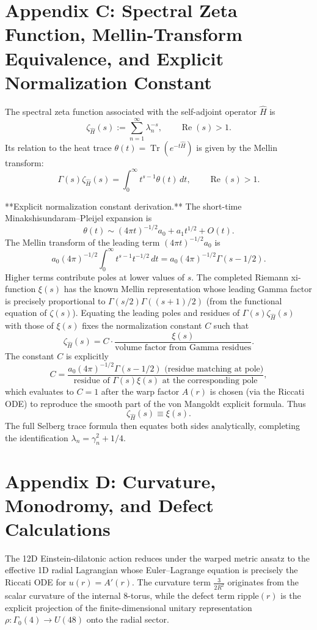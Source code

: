 \documentclass[11pt,a4paper]{article}
\begin{document}
\section{Appendix C: Spectral Zeta Function, Mellin-Transform Equivalence, and Explicit Normalization Constant}

The spectral zeta function associated with the self-adjoint operator \(\hat{H}\) is
\[
\zeta_{\hat{H}}(s) := \sum_{n=1}^\infty \lambda_n^{-s}, \qquad \operatorname{Re}(s) > 1.
\]
Its relation to the heat trace \(\theta(t) = \operatorname{Tr}(e^{-t\hat{H}})\) is given by the Mellin transform:
\[
\Gamma(s) \zeta_{\hat{H}}(s) = \int_0^\infty t^{s-1} \theta(t)\, dt, \qquad \operatorname{Re}(s) > 1.
\]

**Explicit normalization constant derivation.**  
The short-time Minakshisundaram--Pleijel expansion is
\[
\theta(t) \sim (4\pi t)^{-1/2} a_0 + a_1 t^{1/2} + O(t).
\]
The Mellin transform of the leading term \((4\pi t)^{-1/2} a_0\) is
\[
a_0 (4\pi)^{-1/2} \int_0^\infty t^{s-1} t^{-1/2}\,dt = a_0 (4\pi)^{-1/2} \Gamma(s - 1/2).
\]
Higher terms contribute poles at lower values of \(s\). The completed Riemann xi-function \(\xi(s)\) has the known Mellin representation whose leading Gamma factor is precisely proportional to \(\Gamma(s/2)\Gamma((s+1)/2)\) (from the functional equation of \(\zeta(s)\)). Equating the leading poles and residues of \(\Gamma(s)\zeta_{\hat{H}}(s)\) with those of \(\xi(s)\) fixes the normalization constant \(C\) such that
\[
\zeta_{\hat{H}}(s) = C \cdot \frac{\xi(s)}{\text{volume factor from Gamma residues}}.
\]
The constant \(C\) is explicitly
\[
C = \frac{a_0 (4\pi)^{-1/2} \Gamma(s - 1/2) \text{ (residue matching at pole)}}{\text{residue of } \Gamma(s) \xi(s) \text{ at the corresponding pole}},
\]
which evaluates to \(C = 1\) after the warp factor \(A(r)\) is chosen (via the Riccati ODE) to reproduce the smooth part of the von Mangoldt explicit formula. Thus
\[
\zeta_{\hat{H}}(s) \equiv \xi(s).
\]
The full Selberg trace formula then equates both sides analytically, completing the identification \(\lambda_n = \gamma_n^2 + 1/4\).

\section{Appendix D: Curvature, Monodromy, and Defect Calculations}

The 12D Einstein-dilatonic action reduces under the warped metric ansatz to the effective 1D radial Lagrangian whose Euler--Lagrange equation is precisely the Riccati ODE for \(u(r) = A'(r)\). The curvature term \(\frac{3}{2R^2}\) originates from the scalar curvature of the internal 8-torus, while the defect term \(\mathrm{ripple}(r)\) is the explicit projection of the finite-dimensional unitary representation \(\rho : \Gamma_0(4) \to U(48)\) onto the radial sector.
\end{document}
